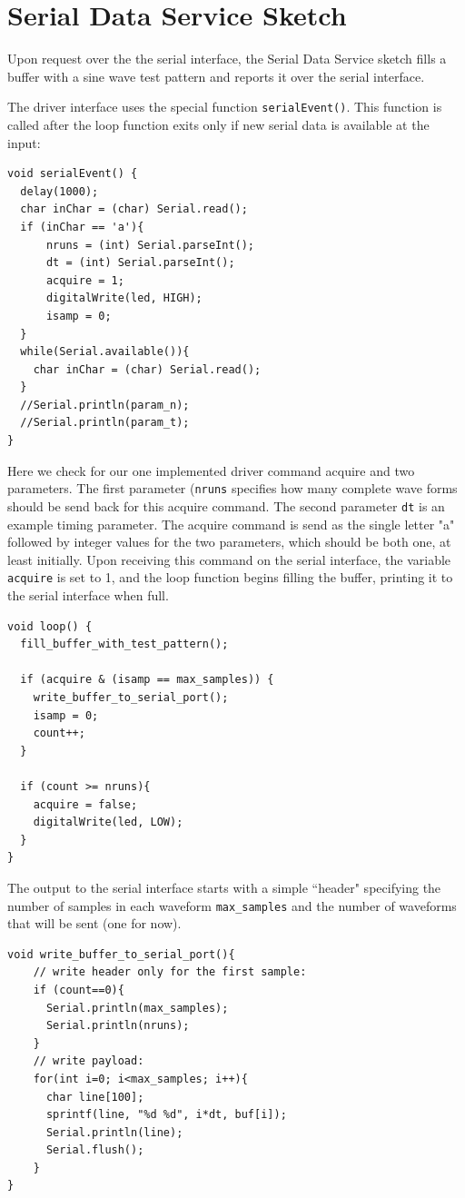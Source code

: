 \documentclass[12pt]{article}
\begin{document}
\section{Serial Data Service Sketch}

Upon request over the the serial interface, the Serial Data Service sketch fills a buffer with a sine wave test pattern and reports it over the serial interface.

The driver interface uses the special function {\tt serialEvent()}.  This function is called after the loop function exits only if new serial data is available at the input:
\begin{verbatim}
void serialEvent() {
  delay(1000);
  char inChar = (char) Serial.read();
  if (inChar == 'a'){
      nruns = (int) Serial.parseInt();
      dt = (int) Serial.parseInt();        
      acquire = 1;
      digitalWrite(led, HIGH);
      isamp = 0;
  }
  while(Serial.available()){
    char inChar = (char) Serial.read();  
  }
  //Serial.println(param_n);
  //Serial.println(param_t);
}
\end{verbatim}
Here we check for our one implemented driver command acquire and two parameters.  The first parameter ({\tt nruns} specifies how many complete wave forms should be send back for this acquire command.  The second parameter {\tt dt} is an example timing parameter.   The acquire command is send as the single letter "a" followed by integer values for the two parameters, which should be both one, at least initially.
Upon receiving this command on the serial interface, the variable {\tt acquire} is set to 1, and the loop function begins filling the buffer, printing it to the serial interface when full.
\begin{verbatim}
void loop() {    
  fill_buffer_with_test_pattern();
  
  if (acquire & (isamp == max_samples)) {
    write_buffer_to_serial_port();
    isamp = 0;    
    count++;
  }

  if (count >= nruns){
    acquire = false;
    digitalWrite(led, LOW);
  }
}
\end{verbatim}
The output to the serial interface starts with a simple ``header" specifying the number of samples in each waveform {\tt max\_samples} and the number of waveforms that will be sent (one for now). 
\begin{verbatim}
void write_buffer_to_serial_port(){
    // write header only for the first sample:
    if (count==0){
      Serial.println(max_samples);
      Serial.println(nruns);
    }
    // write payload:
    for(int i=0; i<max_samples; i++){
      char line[100];
      sprintf(line, "%d %d", i*dt, buf[i]);
      Serial.println(line);
      Serial.flush();
    }
}
\end{verbatim}
\end{document}
